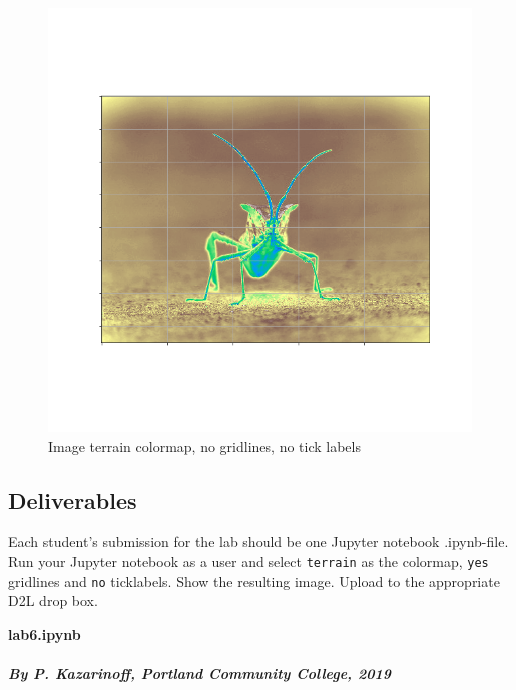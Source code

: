 \documentclass[11pt]{article}
\begin{document}
\begin{figure}
\centering
\includegraphics[scale=0.5]{images/image1.png}
\caption{Image terrain colormap, no gridlines, no tick labels}
\end{figure}

    \hypertarget{deliverables}{%
\subsection{Deliverables}\label{deliverables}}

Each student's submission for the lab should be one Jupyter notebook
.ipynb-file. Run your Jupyter notebook as a user and select
\texttt{terrain} as the colormap, \texttt{yes} gridlines and \texttt{no}
ticklabels. Show the resulting image. Upload to the appropriate D2L drop
box.

\textbf{lab6.ipynb}

    \hypertarget{by-p.-kazarinoff-portland-community-college-2019}{%
\paragraph{\texorpdfstring{\emph{By P. Kazarinoff, Portland Community
College,
2019}}{By P. Kazarinoff, Portland Community College, 2019}}\label{by-p.-kazarinoff-portland-community-college-2019}}


    
    
    
    
\end{document}

